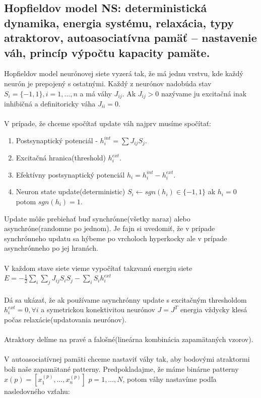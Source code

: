 \documentclass{article}
\numberwithin{equation}{section} %
\begin{document}
\subsection{Hopfieldov model NS: deterministická dynamika, energia systému, relaxácia, typy atraktorov, autoasociatívna pamäť – nastavenie váh, princíp výpočtu kapacity pamäte.}

Hopfieldov model neurónovej siete vyzerá tak, že má jednu vrstvu, kde každý neurón je prepojený s ostatnými. Každý z neurónov nadobúda stav $S_i = \{-1,1\}, i = 1,\dots, n$ a má váhy $J_{ij}$. Ak $J_{ij} > 0$ nazývame ju excitačná inak inhibičná a definitoricky váha $J_{ii} = 0$. \\\\
V prípade, že chceme spočítať update váh najprv musíme spočítať:
\begin{enumerate}
\item Postsynaptický potenciál - $h_i^{int} = \sum J_{ij}S_j$.
\item Excitačná hranica(threshold) $h_i^{ext}$.
\item Efektívny postsynaptický potenciál $h_i = h_i^{int} - h_i^{ext}$.
\item Neuron state update(deterministic) $S_i \leftarrow sgn(h_i) \in \{-1,1\}$ ak $h_i=0$ potom $sgn(h_i) = 1$.
\end{enumerate}
Update môže prebiehať buď synchrónne(všetky naraz) alebo asynchróne(randomne po jednom). Je fajn si uvedomiť, že v prípade synchrónneho updatu sa hýbeme po vrcholoch hyperkocky ale v prípade asynchrónneho po jej hranách.
\\\\
 V každom stave siete vieme vypočítať takzvanú energiu siete $E = -\frac{1}{2}\sum_i\sum_jJ_{ij}S_iS_j - \sum_iS_ih_i^{ext}$
\\\\
Dá sa ukázať, že ak používame asynchrónny update s excitačným thresholdom $h_i^{ext} = 0, \forall i$ a symetrickou konektivitou neurónov $J = J^T$ energia vždycky klesá počas relaxácie(updatovania neurónov). 
\\\\
Atraktory delíme na pravé a falošné(lineárna kombinácia zapamätaných vzorov). 
\\\\
V autoasociatívnej pamäti chceme nastaviť váhy tak, aby bodovými atraktormi boli naše zapamätané patterny.
Predpokladajme, že máme binárne patterny $x{(p)} = [x_1^{(p)}, \dots, x_n^{(p)}]$ $p = 1, \dots, N$, potom váhy nastavíme podľa nasledovného vzťahu: 
\end{document}
